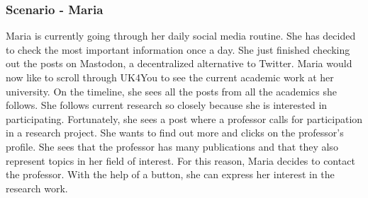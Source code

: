 \subsubsection{Scenario - Maria}
Maria is currently going through her daily social media routine.
She has decided to check the most important information once a day.
She just finished checking out the posts on Mastodon, a decentralized alternative to Twitter.
Maria would now like to scroll through UK4You to see the current academic work at her university.
On the timeline, she sees all the posts from all the academics she follows.
She follows current research so closely because she is interested in participating.
Fortunately, she sees a post where a professor calls for participation in a research project.
She wants to find out more and clicks on the professor's profile.
She sees that the professor has many publications and that they also represent topics in her field of interest.
For this reason, Maria decides to contact the professor.
With the help of a button, she can express her interest in the research work.

